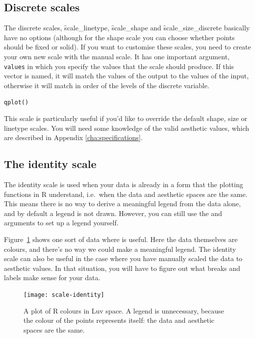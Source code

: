 \subsection{Discrete scales}
\label{sub:scale-discrete}

The discrete scales, \f{scale_linetype}, \f{scale_shape} and \f{scale_size_discrete} basically have no options (although for the shape scale you can choose whether points should be fixed or solid).  If you want to customise these scales, you need to create your own new scale with the manual scale.  It has one important argument, \verb|values| in which you specify the values that the scale should produce.  If this vector is named, it will match the values of the output to the values of the input, otherwise it will match in order of the levels of the discrete variable.  

\begin{alltt}
qplot()
\end{alltt}

This scale is particularly useful if you'd like to override the default shape, size or linetype scales.  You will need some knowledge of the valid aesthetic values, which are described in Appendix \ref{cha:specifications}.

\subsection{The identity scale}
\label{sub:scale-identity}

The identity scale is used when your data is already in a form that the plotting functions in R understand, i.e.\ when the data and aesthetic spaces are the same.  This means there is no way to derive a meaningful legend from the data alone, and by default a legend is not drawn.  However, you can still use the  and  arguments to set up a legend yourself.

Figure~\ref{fig:scale-identity} shows one sort of data where  is useful.  Here the data themselves are colours, and there's no way we could make a meaningful legend.  The identity scale can also be useful in the case where you have manually scaled the data to aesthetic values.  In that situation, you will have to figure out what breaks and labels make sense for your data.

\begin{figure}[htbp]
  \centering
    \texttt{[image: scale-identity]}
  \caption{A plot of R colours in Luv space.  A legend is unnecessary, because the colour of the points represents itself: the data and aesthetic spaces are the same.}
  \label{fig:scale-identity}
\end{figure}

